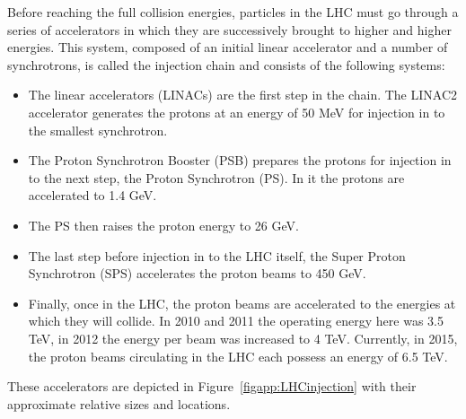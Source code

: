 Before reaching the full collision energies, particles in the LHC must go through a series of accelerators in which they are successively brought to higher and higher energies.  This system, composed of an initial linear accelerator and a number of synchrotrons, is called the injection chain and consists of the following systems:

\begin{itemize}
\item The linear accelerators (LINACs) are the first step in the chain.  The LINAC2 accelerator generates the protons at an energy of 50 MeV for injection in to the smallest synchrotron.
\item The Proton Synchrotron Booster (PSB) prepares the protons for injection in to the next step, the Proton Synchrotron (PS).  In it the protons are accelerated to 1.4 GeV.
\item The PS then raises the proton energy to 26 GeV.
\item The last step before injection in to the LHC itself, the Super Proton Synchrotron (SPS) accelerates the proton beams to 450 GeV.
\item Finally, once in the LHC, the proton beams are accelerated to the energies at which they will collide.  In 2010 and 2011 the operating energy here was 3.5 TeV, in 2012 the energy per beam was increased to 4 TeV.  Currently, in 2015, the proton beams circulating in the LHC each possess an energy of 6.5 TeV.
\end{itemize}

These accelerators are depicted in Figure~\ref{figapp:LHCinjection} with their approximate relative sizes and locations.

